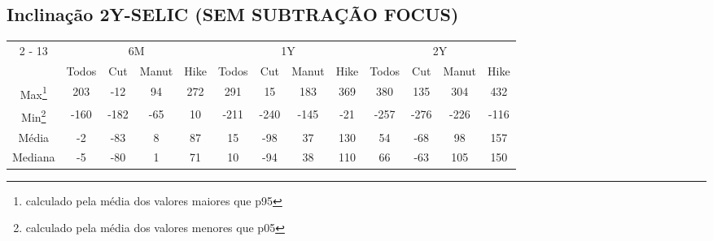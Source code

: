 \documentclass{article}%
\begin{document}
\subsection{Inclinação 2Y{-}SELIC (SEM SUBTRAÇÃO FOCUS)}%
\label{subsec:Inclinao2Y{-}SELIC(SEMSUBTRAOFOCUS)}%
\begin{minipage}{\textwidth}%
\vspace*{0.4in}%
\centering%
\hspace*{-0.3in}%
%
%
\begin{tabular}{c c c c c c c c c c c c c }%
\cline{2%
-%
13}%
&\multicolumn{4}{|c|}{6M}&\multicolumn{4}{c|}{1Y}&\multicolumn{4}{c|}{2Y}\\%
&\multicolumn{1}{|c}{Todos}&\multicolumn{1}{c}{Cut}&\multicolumn{1}{c}{Manut}&\multicolumn{1}{c|}{Hike}&\multicolumn{1}{c}{Todos}&\multicolumn{1}{c}{Cut}&\multicolumn{1}{c}{Manut}&\multicolumn{1}{c|}{Hike}&\multicolumn{1}{c}{Todos}&\multicolumn{1}{c}{Cut}&\multicolumn{1}{c}{Manut}&\multicolumn{1}{c|}{Hike}\\%
\hline%
\multicolumn{1}{|c|}{Max\footnote{calculado pela média dos valores maiores que p95}}&\multicolumn{1}{c}{203}&\multicolumn{1}{c}{{-}12}&\multicolumn{1}{c}{94}&\multicolumn{1}{c|}{272}&\multicolumn{1}{c}{291}&\multicolumn{1}{c}{15}&\multicolumn{1}{c}{183}&\multicolumn{1}{c|}{369}&\multicolumn{1}{c}{380}&\multicolumn{1}{c}{135}&\multicolumn{1}{c}{304}&\multicolumn{1}{c|}{432}\\%
\hline%
\multicolumn{1}{|c|}{Min\footnote{calculado pela média dos valores menores que p05}}&\multicolumn{1}{c}{{-}160}&\multicolumn{1}{c}{{-}182}&\multicolumn{1}{c}{{-}65}&\multicolumn{1}{c|}{10}&\multicolumn{1}{c}{{-}211}&\multicolumn{1}{c}{{-}240}&\multicolumn{1}{c}{{-}145}&\multicolumn{1}{c|}{{-}21}&\multicolumn{1}{c}{{-}257}&\multicolumn{1}{c}{{-}276}&\multicolumn{1}{c}{{-}226}&\multicolumn{1}{c|}{{-}116}\\%
\hline%
\multicolumn{1}{|c|}{Média}&\multicolumn{1}{c}{{-}2}&\multicolumn{1}{c}{{-}83}&\multicolumn{1}{c}{8}&\multicolumn{1}{c|}{87}&\multicolumn{1}{c}{15}&\multicolumn{1}{c}{{-}98}&\multicolumn{1}{c}{37}&\multicolumn{1}{c|}{130}&\multicolumn{1}{c}{54}&\multicolumn{1}{c}{{-}68}&\multicolumn{1}{c}{98}&\multicolumn{1}{c|}{157}\\%
\hline%
\multicolumn{1}{|c|}{Mediana}&\multicolumn{1}{c}{{-}5}&\multicolumn{1}{c}{{-}80}&\multicolumn{1}{c}{1}&\multicolumn{1}{c|}{71}&\multicolumn{1}{c}{10}&\multicolumn{1}{c}{{-}94}&\multicolumn{1}{c}{38}&\multicolumn{1}{c|}{110}&\multicolumn{1}{c}{66}&\multicolumn{1}{c}{{-}63}&\multicolumn{1}{c}{105}&\multicolumn{1}{c|}{150}\\%

\end{tabular}
\end{minipage}
\end{document}
